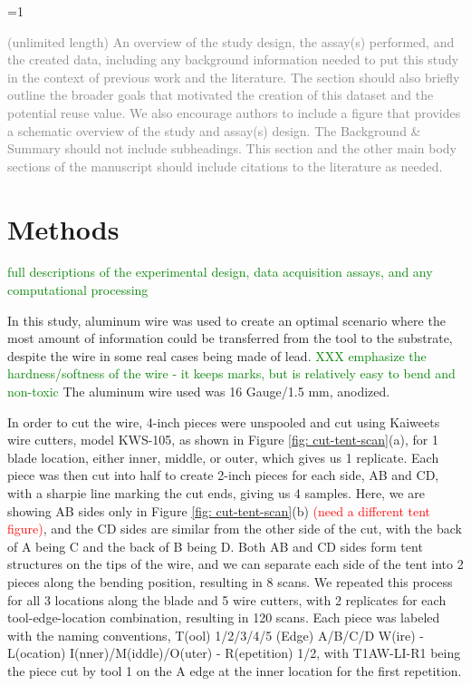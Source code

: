 \documentclass[fleqn,10pt]{wlscirep}
\newcommand{\hh}[1]{{\textcolor{Green}{#1}}}
\newcommand{\ifinstruction}{1} %
\begin{document}
\ifnum \ifinstruction=1

\textcolor{gray}{(unlimited length) An overview of the study design, the assay(s) performed, and the created data, including any background information needed to put this study in the context of previous work and the literature. The section should also briefly outline the broader goals that motivated the creation of this dataset and the potential reuse value. We also encourage authors to include a figure that provides a schematic overview of the study and assay(s) design. The Background \& Summary should not include subheadings. This section and the other main body sections of the manuscript should include citations to the literature as needed.}
\fi

\section*{Methods}

\hh{full descriptions of the experimental design, data acquisition assays, and any computational processing}

In this study, aluminum wire was used to create an optimal scenario
where the most amount of information could be transferred from the tool
to the substrate, despite the wire in some real cases being made of
lead.
\hh{XXX emphasize the hardness/softness of the wire - it keeps marks, but is relatively easy to bend and non-toxic}
The aluminum wire used was 16 Gauge/1.5 mm, anodized.

In order to cut the wire, 4-inch pieces were unspooled and cut using
Kaiweets wire cutters, model KWS-105, as shown in Figure
\ref{fig: cut-tent-scan}(a), for 1 blade location, either inner, middle,
or outer, which gives us 1 replicate. Each piece was then cut into half
to create 2-inch pieces for each side, AB and CD, with a sharpie line
marking the cut ends, giving us 4 samples. Here, we are showing AB sides
only in Figure \ref{fig: cut-tent-scan}(b)
\textcolor{red}{(need a different tent figure)}, and the CD sides are
similar from the other side of the cut, with the back of A being C and
the back of B being D. Both AB and CD sides form tent structures on the
tips of the wire, and we can separate each side of the tent into 2
pieces along the bending position, resulting in 8 scans. We repeated
this process for all 3 locations along the blade and 5 wire cutters,
with 2 replicates for each tool-edge-location combination, resulting in
120 scans. Each piece was labeled with the naming conventions, T(ool)
1/2/3/4/5 (Edge) A/B/C/D W(ire) - L(ocation) I(nner)/M(iddle)/O(uter) -
R(epetition) 1/2, with T1AW-LI-R1 being the piece cut by tool 1 on the A
edge at the inner location for the first repetition.
\end{document}
